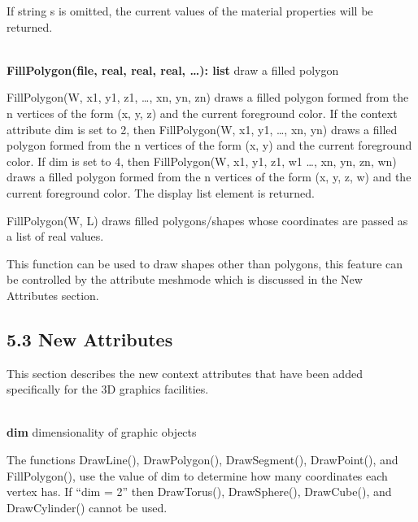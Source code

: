 \documentclass[letterpaper]{article}
\begin{document}
If string s is omitted, the current values of the material properties
will be returned.


\noindent\hrulefill\\
\noindent\textsf{\textbf{FillPolygon(file, real, real, real, {\dots}): list}}
\hfill draw a filled polygon


\bigskip

\textsf{FillPolygon(W, x1, y1, z1, {\dots}, xn, yn, zn)} draws a
filled polygon formed from the n vertices of the form (x, y, z) and
the current foreground color. If the context attribute \textsf{dim} is
set to 2, then \textsf{FillPolygon(W, x1, y1, {\dots}, xn, yn)} draws
a filled polygon formed from the n vertices of the form (x, y) and the
current foreground color. If \textsf{dim} is set to 4, then
\textsf{FillPolygon(W, x1, y1, z1, w1 {\dots}, xn, yn, zn, wn)} draws
a filled polygon formed from the n vertices of the form (x, y, z, w)
and the current foreground color. The display list element is
returned.

FillPolygon(W, L) draws filled polygons/shapes whose coordinates
are passed as a list of real values.


\bigskip

This function can be used to draw shapes other than polygons, this
feature can be controlled by the attribute
\textsf{meshmode} which is discussed in the New Attributes section.


\bigskip

\subsection[5.3 New Attributes]{5.3 New Attributes}


\bigskip

This section describes the new context attributes that have been
added specifically for the 3D graphics facilities.


\bigskip

\noindent\hrulefill\\
\noindent\textsf{\textbf{dim}} \hfill dimensionality of graphic objects

\bigskip

The functions
\textsf{DrawLine(), DrawPolygon(), DrawSegment(), DrawPoint(),}
and \textsf{FillPolygon(),} use the value of
\textsf{dim} to determine how many coordinates each vertex has. If
\textsf{{}``dim = 2''} then
\textsf{DrawTorus(), DrawSphere(), DrawCube()}, and
\textsf{DrawCylinder()} cannot be used.
\end{document}
